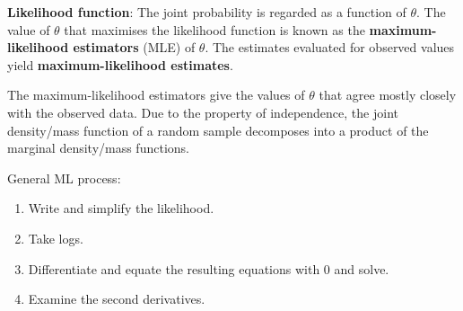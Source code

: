 \documentclass[10pt,a4paper]{article}
\begin{document}
\textbf{Likelihood function}: The joint probability is regarded as a function of $\theta$. The value
of $\theta$ that maximises the likelihood function is known as the \textbf{maximum-likelihood
estimators} (MLE) of $\theta$. The estimates evaluated for observed values yield
\textbf{maximum-likelihood estimates}.

The maximum-likelihood estimators give the values of $\theta$ that agree mostly closely with the
observed data. Due to the property of independence, the joint density/mass function of a random
sample decomposes into a product of the marginal density/mass functions.

\begin{tcolorbox}[breakable,colback=white]
General ML process:
\begin{enumerate}
    \item Write and simplify the likelihood.
    \item Take logs.
    \item Differentiate and equate the resulting equations with $0$ and solve. 
    \item Examine the second derivatives.
\end{enumerate}
\end{tcolorbox}

\end{document}
